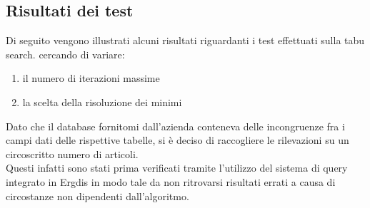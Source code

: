 \subsection{Risultati dei test}
\noindent Di seguito vengono illustrati alcuni risultati riguardanti i test effettuati sulla
tabu search.  cercando di variare:
\begin{enumerate}
    \item il numero di iterazioni massime
    \item la scelta della risoluzione dei minimi
\end{enumerate}
Dato che il database fornitomi dall'azienda conteneva delle incongruenze fra i campi dati
delle rispettive tabelle, si è deciso di raccogliere le rilevazioni su un circoscritto
numero di articoli.\\
Questi infatti sono stati prima verificati tramite l'utilizzo del
sistema di query integrato in Ergdis in modo tale da non ritrovarsi risultati errati
a causa di circostanze non dipendenti dall'algoritmo.
